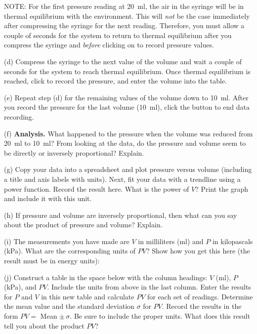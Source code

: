 NOTE: For the first pressure reading at 20~ml, the air in the syringe will be
in thermal equilibrium with the environment. This will \textit{not} be the case immediately
after compressing the syringe for the next reading. Therefore, you must allow
a couple of seconds for the system to return to thermal equilibrium after you 
compress the syringe and \textit{before} clicking on  to record pressure values. 

(d) Compress the syringe to the next value of the volume 
and wait a couple of seconds for the system to reach thermal equilibrium. Once 
thermal equilibrium is reached, click  to record the pressure, and enter the volume into the table.

(e) Repeat step (d) for the remaining values of the volume down to 10~ml.  After you record
the pressure for the last volume (10~ml), click the  button to end data recording.

(f) \textbf{Analysis.} What happened to the pressure when the volume was 
reduced from 20~ml to 10~ml? From looking at the data, do the pressure and 
volume seem to be directly or inversely proportional? Explain.
\vspace{25mm}

(g) Copy your data into a spreadsheet and plot pressure versus volume 
(including a title and axis labels with units). Next, fit your data with a 
trendline using a power function. Record the result here. What is the power of 
$V$? Print the graph and include it with this unit.
\vspace{25mm}

(h) If pressure and volume are inversely proportional, then what can you say
about the product of pressure and volume? Explain.
\vspace{25mm}

\newpage

(i) The measurements you have made are $V$ in milliliters (ml) and $P$ in 
kilopascals (kPa). What are the corresponding units of $PV$? Show how you get 
this here (the result must be in energy units):
\vspace{40mm}

(j) Construct a table in the space below with the column headings: $V$ (ml), $P$
(kPa), and $PV$. Include the units from above in the last column.
Enter the results for $P$ and $V$ in this new table and calculate
$PV$ for each set of readings. Determine the mean value and the standard deviation
$\sigma$ for $PV$. Record the results in the form 
$PV =$ Mean $\pm \, \sigma$. Be sure to include the proper units. 
What does this result tell you about the  product $PV$?

